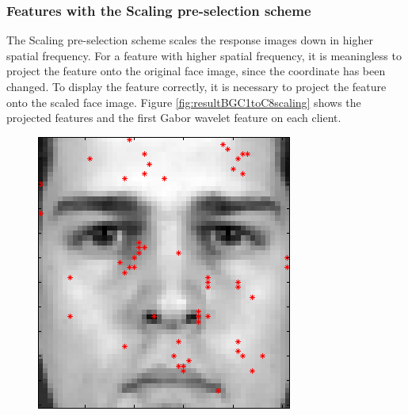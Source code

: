 \subsubsection{Features with the Scaling pre-selection scheme}
The Scaling pre-selection scheme scales the response images down in higher spatial frequency. For a feature with higher spatial frequency, it is meaningless to project the feature onto the original face image, since the coordinate has been changed. To display the feature correctly, it is necessary to project the feature onto the scaled face image. \mbox{Figure} \ref{fig:resultBGC1toC8scaling} shows the projected features and the first Gabor wavelet feature on each client.
\begin{figure}[ht]
 \includegraphics[width=\textwidth*11/100]{ch5/figures/XM2VTS_1_-1.png}

\end{figure}

